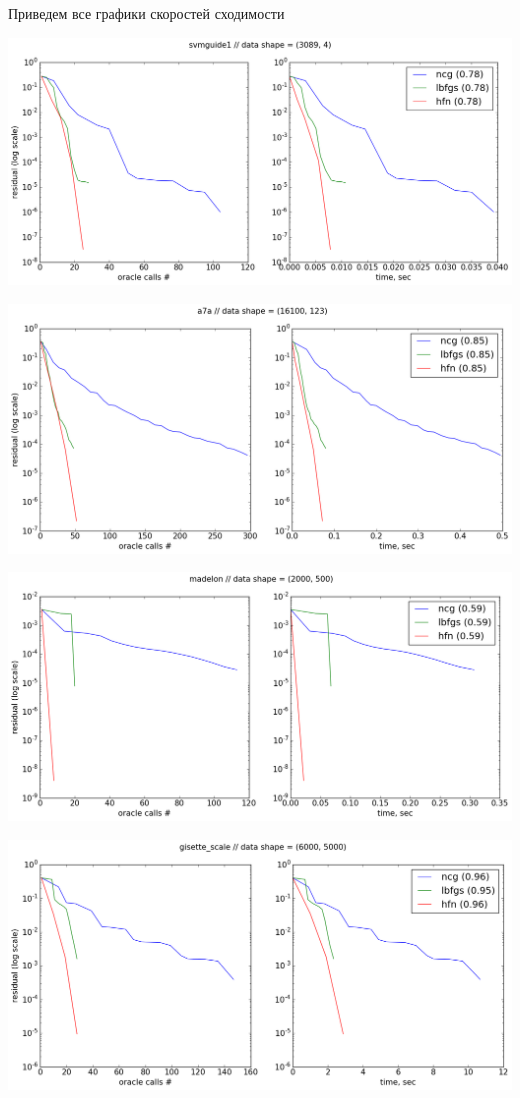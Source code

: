 \documentclass[12pt, a4paper]{article}
\begin{document}
        Приведем все графики скоростей сходимости
        \def \picwidth {15cm}
        \begin{center}\includegraphics[width=\picwidth]{svmguide1.png}\end{center}
        \begin{center}\includegraphics[width=\picwidth]{a7a.png}\end{center}
        \begin{center}\includegraphics[width=\picwidth]{madelon.png}\end{center}
        \begin{center}\includegraphics[width=\picwidth]{gisette_scale.png}\end{center}
\end{document}
